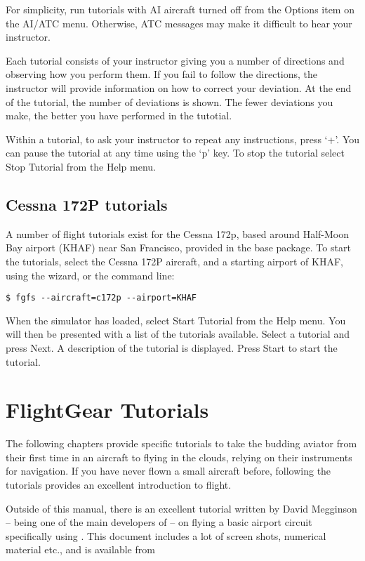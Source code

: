 For simplicity, run tutorials with AI aircraft turned off from
the Options item on the AI/ATC menu. Otherwise, ATC messages 
may make it difficult to hear your instructor.

Each tutorial consists of your instructor giving you a number of directions and
observing how you perform them.  If you fail to follow the directions, the
instructor will provide information on how to correct your deviation. At the end
of the tutorial, the number of deviations is shown. The fewer deviations you
make, the better you have performed in the tutotial.

Within a tutorial, to ask your instructor to repeat any instructions, press 
`+'. You can pause the tutorial at any time using the `p' key. To stop the 
tutorial select Stop Tutorial from the Help menu. 

\subsection{Cessna 172P tutorials}

A number of flight tutorials exist for the Cessna 172p, based around Half-Moon 
Bay airport (KHAF) near San Francisco, provided in the base package. To start 
the tutorials, select the Cessna 172P aircraft, and a starting airport of 
KHAF, using the wizard, or the command line:

\begin{verbatim}
$ fgfs --aircraft=c172p --airport=KHAF
\end{verbatim}

When the simulator has loaded, select Start Tutorial from the Help menu. You
will then be presented with a list of the tutorials available. Select a tutorial
and press Next. A description of the tutorial is displayed. Press Start
 to start the tutorial.

\section{FlightGear Tutorials}

The following chapters provide \FlightGear{} specific tutorials
to take the budding aviator from their first time in an aircraft to flying in 
the clouds, relying on their instruments for navigation. If you have never flown
a small aircraft before, following the tutorials provides an excellent 
introduction to flight.

Outside of this manual, there is an excellent tutorial written by David
Megginson  -- being one of the main developers
of \FlightGear{} -- on flying a basic airport circuit specifically
using \FlightGear{}. This document includes a lot of screen shots,
numerical material etc., and is available from

